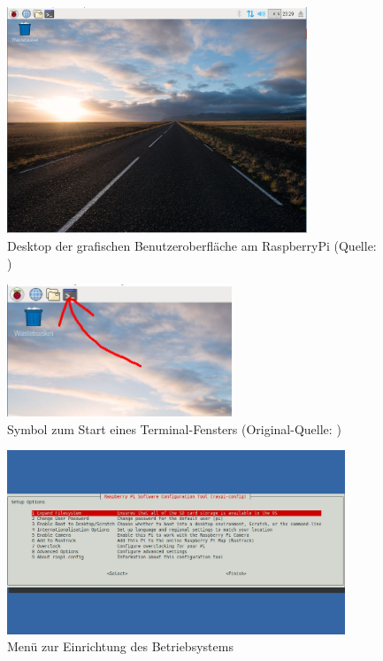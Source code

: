 \begin{figure}[h!]
	\centering
		\includegraphics[width=0.8\textwidth]{./fotos/desktop-pixel.jpg}
	\caption{Desktop der grafischen Benutzeroberfläche am RaspberryPi (Quelle: \cite{deskp})}
	\label{fig:rpidesktop}
\end{figure}

\begin{figure}[h!]
	\centering
		\includegraphics[width=0.6\textwidth]{./fotos/desktop-pixel-term.jpg}
	\caption{Symbol zum Start eines Terminal-Fensters (Original-Quelle: \cite{deskp})}
	\label{fig:rpiterminal}
\end{figure}

\begin{figure}[h!]
	\centering
		\includegraphics[width=0.9\textwidth]{./fotos/menu1.png}
	\caption{Menü zur Einrichtung des Betriebsystems}
	\label{fig:menu}
\end{figure}

